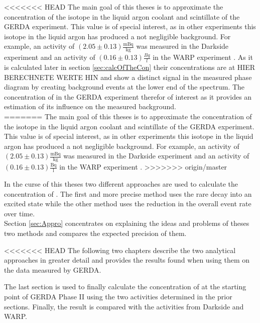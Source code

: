 <<<<<<< HEAD
The main goal of this theses is to approximate the concentration of the isotope  in the liquid argon coolant and scintillate of the GERDA experiment. This value is of special interest, as in other experiments this isotope in the liquid argon has produced a not negligible background. For example, an activity of \((2.05\pm0.13) \mathrm{\frac{mBq}{kg}}\) was measured in the Darkside experiment \cite{PhysRevD.93.081101} and an activity of \((0.16\pm0.13)\frac{Bq}{l}\) in the WARP experiment \cite{Benetti:2006az}. As it is calculated later in section \ref{sec:calcOfTheCon} their concentrations are at HIER BERECHNETE WERTE HIN and show a distinct signal in the measured phase diagram by creating background events at the lower end of the spectrum. The concentration of  in the GERDA experiment therefor of interest as it provides an estimation of its influence on the measured background.\\
=======
The main goal of this theses is to approximate the concentration of the isotope  in the liquid argon coolant and scintillate of the GERDA experiment. This value is of special interest, as in other experiments this isotope in the liquid argon has produced a not negligible background. For example, an activity of \((2.05\pm0.13) \mathrm{\frac{mBq}{kg}}\) was measured in the Darkside experiment \cite{PhysRevD.93.081101} and an activity of \((0.16\pm0.13)\mathrm{\frac{Bq}{l}}\) in the WARP experiment \cite{Benetti:2006az}. 
>>>>>>> origin/master

In the curse of this theses two different approaches are used to calculate the concentration of . The first and more precise method uses the rare  decay into an excited state while the other method uses the reduction in the overall event rate over time.\\

Section \ref{sec:Appro} concentrates on explaining the ideas and problems of theses two methods and compares the expected precision of them. 

<<<<<<< HEAD
The following two chapters describe the two analytical approaches in greater detail and provides the results found when using them on the data measured by GERDA.

The last section is used to finally calculate the concentration of  at the starting point of GERDA Phase II using the two activities determined in the prior sections. Finally, the result is compared with the activities from Darkside and WARP. 


